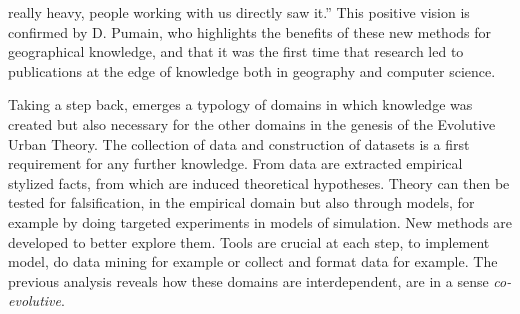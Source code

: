 \documentclass[runningheads,a4paper]{llncs2e/llncs}
\begin{document}
really heavy, people working with us directly saw it.'' This positive vision is confirmed by D. Pumain, who highlights the benefits of these new methods for geographical knowledge, and that it was the first time that research led to publications at the edge of knowledge both in geography and computer science.

Taking a step back, emerges a typology of domains in which knowledge was created but also necessary for the other domains in the genesis of the Evolutive Urban Theory. The collection of data and construction of datasets is a first requirement for any further knowledge. From data are extracted empirical stylized facts, from which are induced theoretical hypotheses. Theory can then be tested for falsification, in the empirical domain but also through models, for example by doing targeted experiments in models of simulation. New methods are developed to better explore them. Tools are crucial at each step, to implement model, do data mining for example or collect and format data for example. The previous analysis reveals how these domains are interdependent, are in a sense \emph{co-evolutive}.
\end{document}
